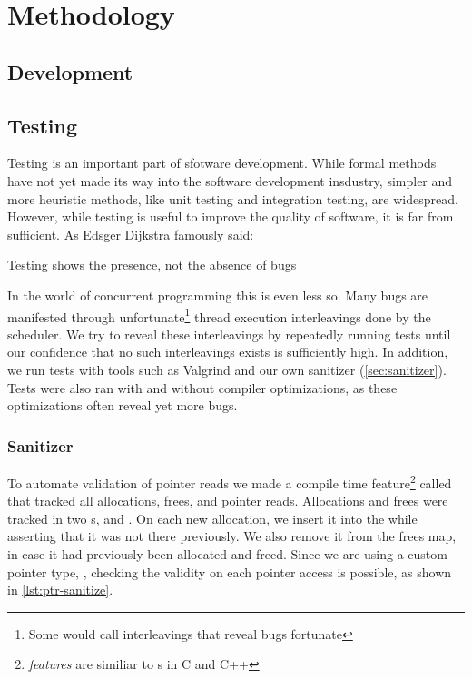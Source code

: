 \chapter{Methodology}
\lorem{}

\clearpage

\section{Development}
\lorem{}


\section{Testing}

Testing is an important part of sfotware development. While formal methods have not yet made its
way into the software development insdustry, simpler and more heuristic methods, like unit testing
and integration testing, are widespread. However, while testing is useful to improve the quality of
software, it is far from sufficient. As Edsger Dijkstra famously said\cite{buxton1970software}: 
\begin{displayquote}
Testing shows the presence, not the absence of bugs
\end{displayquote}

In the world of concurrent programming this is even less so. Many bugs are manifested through
unfortunate\footnote{Some would call interleavings that reveal bugs fortunate} thread execution
interleavings done by the scheduler. We try to reveal these interleavings by repeatedly running
tests until our confidence that no such interleavings exists is sufficiently high. In addition, we
run tests with tools such as Valgrind\cite{valgrind} and our own sanitizer (\cref{sec:sanitizer}).
Tests were also ran with and without compiler optimizations, as these optimizations often reveal
yet more bugs.


\subsection{Sanitizer\label{sec:sanitizer}}

To automate validation of pointer reads we made a compile time feature\footnote{\emph{features} are
similiar to s in C and C++} called  that tracked all allocations,
frees, and pointer reads.  Allocations and frees were tracked in two s,
 and .  On each new allocation, we insert it into the 
while asserting that it was not there previously. We also remove it from the frees map, in case it
had previously been allocated and freed. Since we are using a custom pointer type, ,
checking the validity on each pointer access is possible, as shown in \cref{lst:ptr-sanitize}.

